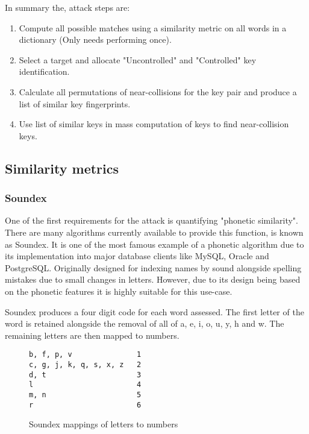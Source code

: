 In summary the, attack steps are:

\begin{enumerate}
    \item Compute all possible matches using a similarity metric on all words in a dictionary (Only needs performing once).

    \item Select a target and allocate "Uncontrolled" and "Controlled" key identification.
    
    \item Calculate all permutations of near-collisions for the key pair and produce a list of similar key fingerprints.
    
    \item Use list of similar keys in mass computation of keys to find near-collision keys.

\end{enumerate}

\subsection{Similarity metrics}

\subsubsection{Soundex}
One of the first requirements for the attack is quantifying "phonetic similarity". There are many algorithms currently available to provide this function, is known as Soundex. It is one of the most famous example of a phonetic algorithm due to its implementation into major database clients like MySQL\cite{mysql_soundex}, Oracle\cite{moved_2005} and PostgreSQL\cite{postgresql}. Originally designed for indexing names by sound alongside spelling mistakes due to small changes in letters. However, due to its design being based on the phonetic features it is highly suitable for this use-case. 

Soundex produces a four digit code for each word assessed.
The first letter of the word is retained alongside the removal of all of a, e, i, o, u, y, h and w. The remaining letters are then mapped to numbers.

\begin{figure}[h!]
    \centering
    \begin{BVerbatim}
b, f, p, v               1
c, g, j, k, q, s, x, z   2
d, t                     3
l                        4
m, n                     5
r                        6
    \end{BVerbatim}

    \caption{Soundex mappings of letters to numbers}
\end{figure}

